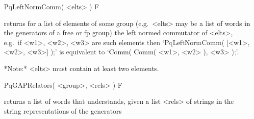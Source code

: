 \>PqLeftNormComm( <elts> ) F

returns for a list of elements of some group (e.g.~<elts> may be  a  list
of words in the generators of  a  free  or  fp  group)  the  left  normed
commutator of <elts>, e.g.~if <w1>, <w2>, <w3>  are  such  elements  then
`PqLeftNormComm( [<w1>, <w2>, <w3>] );' is  equivalent  to  `Comm(  Comm(
<w1>, <w2> ), <w3> );'.

*Note:* <elts> must contain at least two elements.

\>PqGAPRelators( <group>, <rels> ) F

returns a list of words that {\GAP} understands, given a list  <rels>  of
strings in the string representations of the generators
